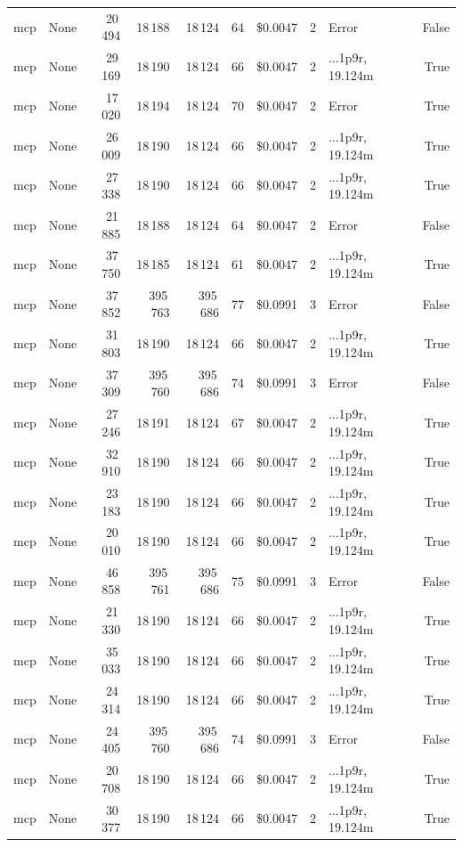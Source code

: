 \documentclass[a4paper,11pt]{article}
\begin{document}
\begin{table}[H]
{\begin{tabular}{l r r r r r r r l r}
mcp & None & 20\,494 & 18\,188 & 18\,124 & 64 & \$0.0047 & 2 & Error & False \\
mcp & None & 29\,169 & 18\,190 & 18\,124 & 66 & \$0.0047 & 2 & ...1p9r, 19.124m & True \\
mcp & None & 17\,020 & 18\,194 & 18\,124 & 70 & \$0.0047 & 2 & Error & True \\
mcp & None & 26\,009 & 18\,190 & 18\,124 & 66 & \$0.0047 & 2 & ...1p9r, 19.124m & True \\
mcp & None & 27\,338 & 18\,190 & 18\,124 & 66 & \$0.0047 & 2 & ...1p9r, 19.124m & True \\
mcp & None & 21\,885 & 18\,188 & 18\,124 & 64 & \$0.0047 & 2 & Error & False \\
mcp & None & 37\,750 & 18\,185 & 18\,124 & 61 & \$0.0047 & 2 & ...1p9r, 19.124m & True \\
mcp & None & 37\,852 & 395\,763 & 395\,686 & 77 & \$0.0991 & 3 & Error & False \\
mcp & None & 31\,803 & 18\,190 & 18\,124 & 66 & \$0.0047 & 2 & ...1p9r, 19.124m & True \\
mcp & None & 37\,309 & 395\,760 & 395\,686 & 74 & \$0.0991 & 3 & Error & False \\
mcp & None & 27\,246 & 18\,191 & 18\,124 & 67 & \$0.0047 & 2 & ...1p9r, 19.124m & True \\
mcp & None & 32\,910 & 18\,190 & 18\,124 & 66 & \$0.0047 & 2 & ...1p9r, 19.124m & True \\
mcp & None & 23\,183 & 18\,190 & 18\,124 & 66 & \$0.0047 & 2 & ...1p9r, 19.124m & True \\
mcp & None & 20\,010 & 18\,190 & 18\,124 & 66 & \$0.0047 & 2 & ...1p9r, 19.124m & True \\
mcp & None & 46\,858 & 395\,761 & 395\,686 & 75 & \$0.0991 & 3 & Error & False \\
mcp & None & 21\,330 & 18\,190 & 18\,124 & 66 & \$0.0047 & 2 & ...1p9r, 19.124m & True \\
mcp & None & 35\,033 & 18\,190 & 18\,124 & 66 & \$0.0047 & 2 & ...1p9r, 19.124m & True \\
mcp & None & 24\,314 & 18\,190 & 18\,124 & 66 & \$0.0047 & 2 & ...1p9r, 19.124m & True \\
mcp & None & 24\,405 & 395\,760 & 395\,686 & 74 & \$0.0991 & 3 & Error & False \\
mcp & None & 20\,708 & 18\,190 & 18\,124 & 66 & \$0.0047 & 2 & ...1p9r, 19.124m & True \\
mcp & None & 30\,377 & 18\,190 & 18\,124 & 66 & \$0.0047 & 2 & ...1p9r, 19.124m & True \\

\end{tabular}}
\end{table}
\end{document}
